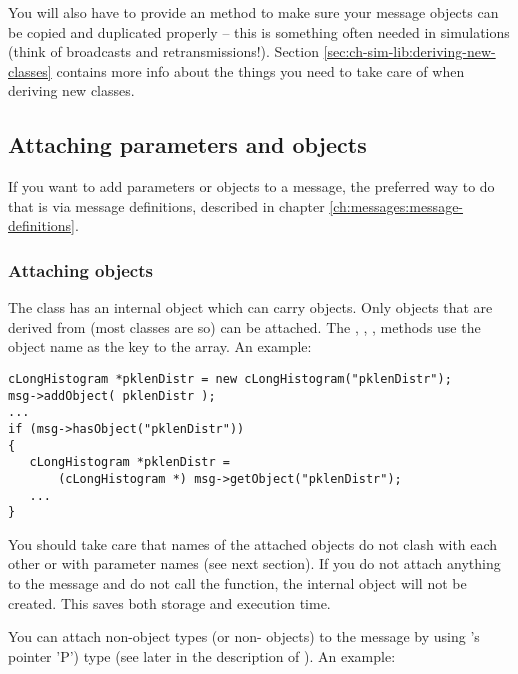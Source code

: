You will also have to provide an  method to
make sure your message objects can be copied and duplicated
properly -- this is something often needed in simulations
(think of broadcasts and retransmissions!). Section
\ref{sec:ch-sim-lib:deriving-new-classes} contains more info
about the things you need to take care of when deriving new classes.



\subsection{Attaching parameters and objects}

If you want to add parameters or objects to a message, the preferred
way to do that is via message definitions, described in chapter
\ref{ch:messages:message-definitions}.


\subsubsection{Attaching objects}

The  class has an internal  object which can
carry objects. Only objects
that are derived from  (most {\opp} classes are so) can be attached.
The , , ,
 methods use the object name
as the key to the array. An example:

\begin{verbatim}
cLongHistogram *pklenDistr = new cLongHistogram("pklenDistr");
msg->addObject( pklenDistr );
...
if (msg->hasObject("pklenDistr"))
{
   cLongHistogram *pklenDistr =
       (cLongHistogram *) msg->getObject("pklenDistr");
   ...
}
\end{verbatim}

You should take care that names of the attached objects do not
clash with each other or with  parameter names
(see next section).
If you do not attach anything to the message and do not call the
 function, the internal  object
will not be created.
This saves both storage and execution time.

You can attach non-object types (or non- objects) to
the message by using
's  pointer 'P') type (see later in the description
of ). An example:

